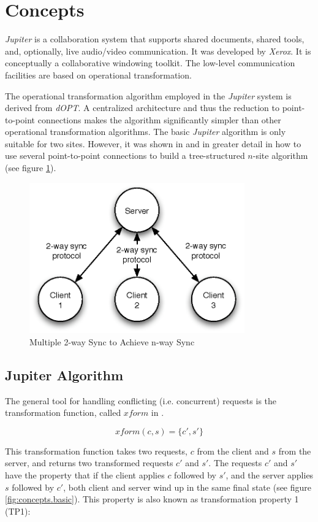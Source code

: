 \section{Concepts}
\emph{Jupiter} is a collaboration system that supports shared documents, shared tools, and, optionally, live audio/video communication. It was developed by \emph{Xerox}. It is conceptually a collaborative windowing toolkit. The low-level communication facilities are based on operational transformation.

The operational transformation algorithm employed in the \emph{Jupiter} system is derived from \emph{dOPT}. A centralized architecture and thus the reduction to point-to-point connections makes the algorithm significantly simpler than other operational transformation algorithms. The basic \emph{Jupiter} algorithm is only suitable for two sites. However, it was shown in \cite{jupiter95} and in greater detail in \cite{netedit:thesis} how to use several point-to-point connections to build a tree-structured $n$-site algorithm (see figure \ref{fig:concepts.nway}).

\begin{figure}[htb]
 \centering
 \includegraphics[width=9.3cm,height=6.5cm]{../../images/concepts_nway.eps}
 \caption{Multiple 2-way Sync to Achieve n-way Sync}
 \label{fig:concepts.nway}
\end{figure}

\subsection{Jupiter Algorithm}
The general tool for handling conflicting (i.e. concurrent) requests is the transformation function, called $xform$ in \cite{jupiter95}.

$$ xform(c,s)=\{c',s'\} $$

This transformation function takes two requests, $c$ from the client and $s$ from the server, and returns two transformed requests $c'$ and $s'$. The requests $c'$ and $s'$ have the property that if the client applies $c$ followed by $s'$, and the server applies $s$ followed by $c'$, both client and server wind up in the same final state (see figure \ref{fig:concepts.basic}). This property is also known as transformation property 1 (TP1):

